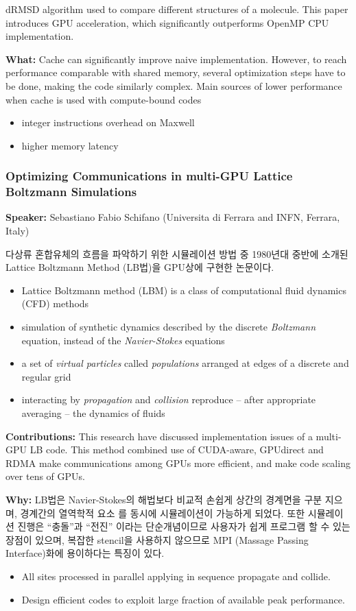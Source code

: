 \documentclass[twocolumn]{article}
\newcommand{\bi}{\begin{itemize}}
\newcommand{\ei}{\end{itemize}}
\newcommand{\ii}{\item}
\begin{document}
dRMSD algorithm used to compare different structures of a molecule. 
This paper introduces GPU acceleration, which significantly outperforms OpenMP CPU implementation.

\noindent
\textbf{What:}  
Cache can significantly improve naive implementation.
However, to reach performance comparable with shared memory, several optimization steps have to be done, making the code similarly complex.
Main sources of lower performance when cache is used with compute-bound codes
\bi
\ii integer instructions overhead on Maxwell 
\ii higher memory latency
\ei

\subsubsection{Optimizing Communications in multi-GPU Lattice Boltzmann Simulations}
\textbf{Speaker:} Sebastiano Fabio Schifano (Universita di Ferrara and INFN, Ferrara, Italy)

다상류 혼합유체의 흐름을 파악하기 위한 시뮬레이션 방법 중 1980년대 중반에 소개된 Lattice Boltzmann Method (LB법)을 GPU상에 구현한 논문이다.

\bi
\ii Lattice Boltzmann method (LBM) is a class of computational fluid dynamics (CFD) methods
\ii  simulation of synthetic dynamics described by the discrete \textit{Boltzmann} equation, instead of the \textit{Navier-Stokes} equations
\ii a set of \textit{virtual particles} called \textit{populations} arranged at edges of a discrete and regular grid
\ii  interacting by \textit{propagation} and \textit{collision} reproduce – after appropriate averaging – the dynamics of fluids
\ei
\noindent
\textbf{Contributions:}  
This research have discussed implementation issues of a multi-GPU LB code. This method combined use of CUDA-aware, GPUdirect and RDMA make communications among GPUs more efficient, and make code scaling over tens of GPUs.

\noindent
\textbf{Why:}  
LB법은 Navier-Stokes의 해법보다 비교적 손쉽게 상간의 경계면을 구분 지으며, 경계간의 열역학적 요소 를 동시에 시뮬레이션이 가능하게 되었다.
또한 시뮬레이션 진행은 “충돌”과 “전진” 이라는 단순개념이므로 사용자가 쉽게 프로그램 할 수 있는 장점이 있으며, 
복잡한 stencil을 사용하지 않으므로 MPI (Massage Passing Interface)화에 용이하다는 특징이 있다.
\bi
\ii All sites processed in parallel applying in sequence propagate and collide.
\ii Design efficient codes to exploit large fraction of available peak performance.
\ei
\end{document}
